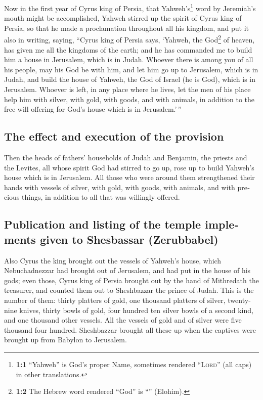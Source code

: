 \begin{paracol}{2}
\begin{otherlanguage}{english}
 Now in the first year of Cyrus king of Persia, that
Yahweh's\footnote{\textbf{1:1} ``Yahweh'' is God's proper Name,
  sometimes rendered ``\textsc{Lord}'' (all caps) in other translations.}
word by Jeremiah's mouth might be accomplished, Yahweh stirred up the
spirit of Cyrus king of Persia, so that he made a proclamation
throughout all his kingdom, and put it also in writing, saying,
 ``Cyrus king of Persia says, `Yahweh, the God\footnote{\textbf{1:2}
  The Hebrew word rendered ``God'' is ``'' (Elohim).} of
heaven, has given me all the kingdoms of the earth; and he has commanded
me to build him a house in Jerusalem, which is in Judah. 
Whoever there is among you of all his people, may his God be with him,
and let him go up to Jerusalem, which is in Judah, and build the house
of Yahweh, the God of Israel (he is God), which is in Jerusalem.
 Whoever is left, in any place where he lives, let the men
of his place help him with silver, with gold, with goods, and with
animals, in addition to the free will offering for God's house which is
in Jerusalem.'\,''

\hypertarget{the-effect-and-execution-of-the-provision}{%
\subsection{The effect and execution of the
provision}\label{the-effect-and-execution-of-the-provision}}

 Then the heads of fathers' households of Judah and
Benjamin, the priests and the Levites, all whose spirit God had stirred
to go up, rose up to build Yahweh's house which is in Jerusalem.
 All those who were around them strengthened their hands
with vessels of silver, with gold, with goods, with animals, and with
precious things, in addition to all that was willingly offered.

\hypertarget{publication-and-listing-of-the-temple-implements-given-to-shesbassar-zerubbabel}{%
\subsection{Publication and listing of the temple implements given to
Shesbassar
(Zerubbabel)}\label{publication-and-listing-of-the-temple-implements-given-to-shesbassar-zerubbabel}}

 Also Cyrus the king brought out the vessels of Yahweh's
house, which Nebuchadnezzar had brought out of Jerusalem, and had put in
the house of his gods;  even those, Cyrus king of Persia
brought out by the hand of Mithredath the treasurer, and counted them
out to Sheshbazzar the prince of Judah.  This is the
number of them: thirty platters of gold, one thousand platters of
silver, twenty-nine knives,  thirty bowls of gold, four
hundred ten silver bowls of a second kind, and one thousand other
vessels.  All the vessels of gold and of silver were five
thousand four hundred. Sheshbazzar brought all these up when the
captives were brought up from Babylon to Jerusalem.


\end{otherlanguage}
\end{paracol}
